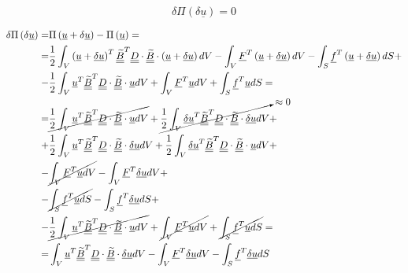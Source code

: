 \documentclass[a4paper]{jpconf}
\begin{document}
\begin{equation}
\delta\Pi\left(\delta\underline{u}\right)=0
\end{equation}

\begin{equation}
\begin{split}
\delta\Pi\left(\delta\underline{u}\right)=&\Pi\left(\underline{u}+\delta\underline{u}\right)-\Pi\left(\underline{u}\right)=\\=&\frac{1}{2}\int_{V}\left(\underline{u}+\underline{\delta u}\right)^{T}\underline{\underline{\widetilde{B}}}^{T}\underline{\underline{D}}\cdot\underline{\underline{\widetilde{B}}}\cdot\left(\underline{u}+\underline{\delta u}\right)dV-\int_{V}\underline{F}^{T}\left(\underline{u}+\underline{\delta u}\right)dV-\int_{S}\underline{f}^{T}\left(\underline{u}+\underline{\delta u}\right)dS+\\
-&\frac{1}{2}\int_{V}\underline{u}^{T}\underline{\underline{\widetilde{B}}}^{T}\underline{\underline{D}}\cdot\underline{\underline{\widetilde{B}}}\cdot\underline{u}dV+\int_{V}\underline{F}^{T}\underline{u}dV+\int_{S}\underline{f}^{T}\underline{u}dS=\\
=&\cancel{\frac{1}{2}\int_{V}\underline{u}^{T}\underline{\underline{\widetilde{B}}}^{T}\underline{\underline{D}}\cdot\underline{\underline{\widetilde{B}}}\cdot\underline{u}dV}+\cancelto{\approx 0}{\frac{1}{2}\int_{V}\underline{\delta u}^{T}\underline{\underline{\widetilde{B}}}^{T}\underline{\underline{D}}\cdot\underline{\underline{\widetilde{B}}}\cdot\underline{\delta u}dV}+\\
+&\frac{1}{2}\int_{V}\underline{u}^{T}\underline{\underline{\widetilde{B}}}^{T}\underline{\underline{D}}\cdot\underline{\underline{\widetilde{B}}}\cdot\underline{\delta u}dV+\frac{1}{2}\int_{V}\underline{\delta u}^{T}\underline{\underline{\widetilde{B}}}^{T}\underline{\underline{D}}\cdot\underline{\underline{\widetilde{B}}}\cdot\underline{u}dV+\\
-&\cancel{\int_{V}\underline{F}^{T}\underline{u}dV}-\int_{V}\underline{F}^{T}\underline{\delta u}dV+\\
-&\cancel{\int_{S}\underline{f}^{T}\underline{u}dS}-\int_{S}\underline{f}^{T}\underline{\delta u}dS+\\
-&\cancel{\frac{1}{2}\int_{V}\underline{u}^{T}\underline{\underline{\widetilde{B}}}^{T}\underline{\underline{D}}\cdot\underline{\underline{\widetilde{B}}}\cdot\underline{u}dV}+\cancel{\int_{V}\underline{F}^{T}\underline{u}dV}+\cancel{\int_{S}\underline{f}^{T}\underline{u}dS}=\\
=&\int_{V}\underline{u}^{T}\underline{\underline{\widetilde{B}}}^{T}\underline{\underline{D}}\cdot\underline{\underline{\widetilde{B}}}\cdot\underline{\delta u}dV-\int_{V}\underline{F}^{T}\underline{\delta u}dV-\int_{S}\underline{f}^{T}\underline{\delta u}dS
\end{split}
\end{equation}
\end{document}
